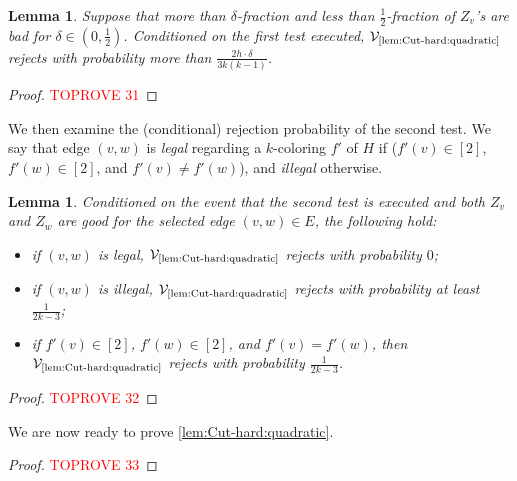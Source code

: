 \documentclass[11pt,fleqn]{article}
\newcommand{\V}{\calV}
\newcommand{\f}{f}
\newcommand{\Vquad}{\V_{\text{\ref{lem:Cut-hard:quadratic}}}}
\newcommand{\calV}{\mathcal{V}}
\newtheorem{lemma}[theorem]{Lemma}
\theoremstyle{definition}
\numberwithin{equation}{section}
\begin{document}
\begin{lemma}
\label{lem:Cut-hard:quadratic:first}
Suppose that more than $\delta$-fraction and less than $\frac{1}{2}$-fraction of $Z_v$'s are bad for
$\delta \in \left(0,\frac{1}{2}\right)$.
Conditioned on the first test executed,
$\Vquad$ rejects with probability more than $\frac{2h \cdot \delta}{3k(k-1)}$.
\end{lemma}
\begin{proof}\textcolor{red}{TOPROVE 31}\end{proof}




We then examine the (conditional) rejection probability of the second test.
We say that edge $(v,w)$ is \emph{legal} regarding a $k$-coloring $\f'$ of $H$ if
($\f'(v) \in [2]$, $\f'(w) \in [2]$, and $\f'(v) \neq \f'(w)$), and
\emph{illegal} otherwise.

\begin{lemma}
\label{lem:Cut-hard:quadratic:second}
Conditioned on the event that
the second test is executed and
both $Z_v$ and $Z_w$ are good for the selected edge $(v,w) \in E$,
the following hold\textup{:}
    \begin{itemize}
    \item if $(v,w)$ is legal, $\Vquad$ rejects with probability $0$\textup{;}
    
    \item if $(v,w)$ is illegal, $\Vquad$ rejects with probability at least $\frac{1}{2k-3}$\textup{;}
    
    \item if $\f'(v) \in [2]$, $\f'(w) \in [2]$, and $\f'(v) = \f'(w)$,
        then $\Vquad$ rejects with probability $\frac{1}{2k-3}$.
    \end{itemize}
\end{lemma}
\begin{proof}\textcolor{red}{TOPROVE 32}\end{proof}





We are now ready to prove \cref{lem:Cut-hard:quadratic}.

\begin{proof}\textcolor{red}{TOPROVE 33}\end{proof}
 
\printbibliography 
\end{document}
